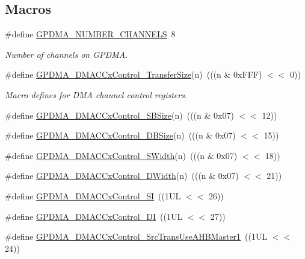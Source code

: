\subsection*{Macros}
\begin{DoxyCompactItemize}
\item 
\#define \hyperlink{group___g_p_d_m_a__18_x_x__43_x_x_gaf7c43b3d13c91c30ddf67e479966d5cd}{G\+P\+D\+M\+A\+\_\+\+N\+U\+M\+B\+E\+R\+\_\+\+C\+H\+A\+N\+N\+E\+LS}~8
\begin{DoxyCompactList}\small\item\em Number of channels on G\+P\+D\+MA. \end{DoxyCompactList}\item 
\#define \hyperlink{group___g_p_d_m_a__18_x_x__43_x_x_ga0e3ee35f724f4ef0cc8e91dfaec761e4}{G\+P\+D\+M\+A\+\_\+\+D\+M\+A\+C\+Cx\+Control\+\_\+\+Transfer\+Size}(n)~(((n \& 0x\+F\+F\+F) $<$$<$ 0))
\begin{DoxyCompactList}\small\item\em Macro defines for D\+MA channel control registers. \end{DoxyCompactList}\item 
\#define \hyperlink{group___g_p_d_m_a__18_x_x__43_x_x_ga1f5c9d534965c6a89ea22ca3fa48d859}{G\+P\+D\+M\+A\+\_\+\+D\+M\+A\+C\+Cx\+Control\+\_\+\+S\+B\+Size}(n)~(((n \& 0x07) $<$$<$ 12))
\item 
\#define \hyperlink{group___g_p_d_m_a__18_x_x__43_x_x_ga18c40b7931f0b6cfe8b81f9a982c0641}{G\+P\+D\+M\+A\+\_\+\+D\+M\+A\+C\+Cx\+Control\+\_\+\+D\+B\+Size}(n)~(((n \& 0x07) $<$$<$ 15))
\item 
\#define \hyperlink{group___g_p_d_m_a__18_x_x__43_x_x_ga2ee63289c5e248a07ea901e233e1dd00}{G\+P\+D\+M\+A\+\_\+\+D\+M\+A\+C\+Cx\+Control\+\_\+\+S\+Width}(n)~(((n \& 0x07) $<$$<$ 18))
\item 
\#define \hyperlink{group___g_p_d_m_a__18_x_x__43_x_x_ga67bb6ed286afe6d4091c0fcd8799b451}{G\+P\+D\+M\+A\+\_\+\+D\+M\+A\+C\+Cx\+Control\+\_\+\+D\+Width}(n)~(((n \& 0x07) $<$$<$ 21))
\item 
\#define \hyperlink{group___g_p_d_m_a__18_x_x__43_x_x_gaa9b006e86536835dfe6f7034ee25d12a}{G\+P\+D\+M\+A\+\_\+\+D\+M\+A\+C\+Cx\+Control\+\_\+\+SI}~((1\+U\+L $<$$<$ 26))
\item 
\#define \hyperlink{group___g_p_d_m_a__18_x_x__43_x_x_gaddcec41c911bbd0911391e6195c1c040}{G\+P\+D\+M\+A\+\_\+\+D\+M\+A\+C\+Cx\+Control\+\_\+\+DI}~((1\+U\+L $<$$<$ 27))
\item 
\#define \hyperlink{group___g_p_d_m_a__18_x_x__43_x_x_ga90b29a1b2c82b32d6e586d74cdd727b7}{G\+P\+D\+M\+A\+\_\+\+D\+M\+A\+C\+Cx\+Control\+\_\+\+Src\+Trans\+Use\+A\+H\+B\+Master1}~((1\+U\+L $<$$<$ 24))

\end{DoxyCompactItemize}
